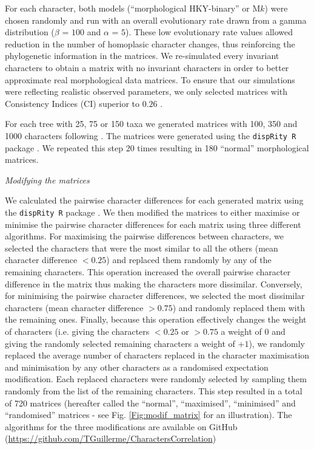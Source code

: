 \documentclass[12pt,letterpaper]{article}
\renewcommand{\subsection}[1]{%
\bigskip
\begin{center}
\begin{large}
\normalfont\itshape #1
\end{large}
\end{center}}
\begin{document}
\noindent For each character, both models (``morphological HKY-binary'' or M$k$) were chosen randomly and run with an overall evolutionary rate drawn from a gamma distribution ($\beta$ = $100$ and $\alpha$ = $5$).
These low evolutionary rate values allowed reduction in the number of homoplasic character changes, thus reinforcing the phylogenetic information in the matrices.
We re-simulated every invariant characters to obtain a matrix with no invariant characters in order to better approximate real morphological data matrices.
To ensure that our simulations were reflecting realistic observed parameters, we only selected matrices with Consistency Indices (CI) superior to $0.26$ \citep{sanderson1989patterns,OReilly20160081}.

For each tree with 25, 75 or 150 taxa we generated matrices with 100, 350 and 1000 characters following \cite{OReilly20160081}.
The matrices were generated using the \texttt{dispRity R} package \citep{thomas_guillerme_2016_55646}.
We repeated this step 20 times resulting in 180 ``normal'' morphological matrices.

\subsection{Modifying the matrices}
We calculated the pairwise character differences for each generated matrix using the \texttt{dispRity R} package \citep{thomas_guillerme_2016_55646}.
We then modified the matrices to either maximise or minimise the pairwise character differences for each matrix using three different algorithms.
For maximising the pairwise differences between characters, we selected the characters that were the most similar to all the others (mean character difference $<0.25$) and replaced them randomly by any of the remaining characters.
This operation increased the overall pairwise character difference in the matrix thus making the characters more dissimilar.
Conversely, for minimising the pairwise character differences, we selected the most dissimilar characters (mean character difference $>0.75$) and randomly replaced them with the remaining ones.
Finally, because this operation effectively changes the weight of characters (i.e. giving the characters $<0.25$ or $>0.75$ a weight of $0$ and giving the randomly selected remaining characters a weight of +$1$), we randomly replaced the average number of characters replaced in the character maximisation and minimisation by any other characters as a randomised expectation modification.
Each replaced characters were randomly selected by sampling them randomly from the list of the remaining characters.
This step resulted in a total of 720 matrices (hereafter called the ``normal'', ``maximised'', ``minimised'' and ``randomised'' matrices - see Fig. \ref{Fig:modif_matrix} for an illustration).
The algorithms for the three modifications are available on GitHub (\url{https://github.com/TGuillerme/CharactersCorrelation})
\end{document}
